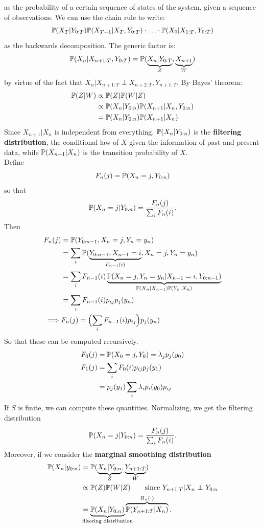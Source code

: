 \documentclass{article}
\begin{document}
as the probability of a certain sequence of states of the system, given a sequence of observations. We can use the chain rule to write:
\[
\mathbb{P}(X_T|Y_{0:T})\mathbb{P}(X_{T-1}|X_T,Y_{0:T})\cdot\ldots\cdot\mathbb{P}(X_0|X_{1:T},Y_{0:T})
\]
as the backwards decomposition. The generic factor is:
\begin{equation*}
    \prob(X_n|X_{n+1:T},Y_{0:T})=\prob(\underbrace{X_n|Y_{0:T}}_{\mathclap{Z}},\underbrace{X_{n+1}}_{W})
\end{equation*}
by virtue of the fact that $X_n|X_{n+1:T}\perp X_{n+2:T},Y_{n+1:T}$. By Bayes' theorem:
\begin{align*}
    \mathbb{P}(Z|W)&\propto\mathbb{P}(Z)\mathbb{P}(W|Z)\\
    &\propto\mathbb{P}(X_n|Y_{0:n})\mathbb{P}(X_{n+1}|X_n,Y_{0:n})\\
    &=\mathbb{P}(X_n|Y_{0:n})\mathbb{P}(X_{n+1}|X_n)
\end{align*}
Since $X_{n+1}|X_n$ is independent from everything. $\mathbb{P}(X_n|Y_{0:n})$ is the \textbf{filtering distribution}, the conditional law of $X$ given the information of past and present data, while $\mathbb{P}(X_{n+1}|X_n)$ is the transition probability of $X$. \\Define
\[F_n(j)=\mathbb{P}(X_n=j,Y_{0:n})\] so that
\[
\mathbb{P}(X_n=j|Y_{0:n})=\frac{F_n(j)}{\sum_i F_n(i)}.
\]
Then
\begin{align*}
    F_n(j)&=\mathbb{P}(Y_{0:n-1},X_n=j,Y_n=y_n)\\
    &=\sum_i\mathbb{P}(\underbrace{Y_{0:n-1},X_{n-1}=i}_{F_{n-1}(i)},X_n=j,Y_n=y_n)\\
    &=\sum_i F_{n-1}(i)\underbrace{\mathbb{P}(X_n=j,Y_n=y_n|X_{n-1}=i,Y_{0:n-1})}_{\mathbb{P}(X_n|X_{n-1})\mathbb{P}(Y_n|X_n)}\\
    &=\sum_i F_{n-1}(i)p_{ij}p_j(y_n)\\
    \implies &F_n(j)=\Bigl(\sum_iF_{n-1}(i)p_{ij}\Bigr)p_j(y_n)
\end{align*}
So that these can be computed recursively.
\begin{align*}
    F_0(j)&=\mathbb{P}(X_0=j,Y_0)=\lambda_jp_j(y_0)\\
    F_1(j)&=\sum_i F_0(i)p_{ij}p_j(y_1)\\
    &=p_j(y_1)\sum_i\lambda_i p_i(y_0)p_{ij}
\end{align*}
If $S$ is finite, we can compute these quantities. Normalizing, we get the filtering distribution
\[
\mathbb{P}(X_n=j|Y_{0:n})=\frac{F_n(j)}{\sum_i F_n(i)}.
\]
Moreover, if we consider the \textbf{marginal smoothing distribution}
\begin{align*}
    \prob(X_n|y_{0:n})&=\prob(\underbrace{X_n|Y_{0:n}}_{Z},\underbrace{Y_{n+1:T}}_{W})\\
    &\propto\prob(Z)\prob(W|Z)\qquad\text{since }Y_{n+1:T}|X_n \independent Y_{0:n}\\
    &=\underbrace{\prob(X_n|Y_{0:n})}_{\mathclap{\text{filtering distribution}}}\overbrace{\prob(Y_{n+1:T}|X_n)}^{\mathclap{B_n(\cdot)}}.
\end{align*}
\end{document}
